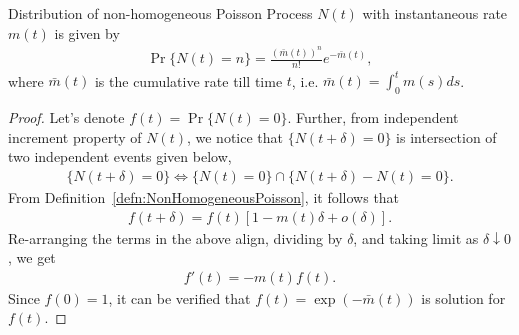 \documentclass[a4paper,english,10pt]{article}
\begin{document}
\begin{prop} Distribution of non-homogeneous Poisson Process $N(t)$ with instantaneous rate $m(t)$ is given by
	\begin{align*}
		\Pr\{N(t)=n\}=\frac{(\bar{m}(t))^n}{n!}e^{-\bar{m}(t)},
	\end{align*}
	where $\bar{m}(t)$ is the cumulative rate till time $t$, i.e. $\bar{m}(t)=\int_{0}^{t}m(s)ds$. 
\end{prop}
\begin{proof}
	Let's denote $f(t) = \Pr\{N(t)=0\}$. Further, from independent increment property of $N(t)$, we notice that $\{N(t+\delta) = 0\}$ is intersection of two independent events given below, 
	\begin{align*}
		\{N(t+\delta)=0\} \iff \{N(t)=0\}\cap\{N(t+\delta)-N(t)=0\}.
	\end{align*}
	From Definition~\ref{defn:NonHomogeneousPoisson}, it follows that
	\begin{align*}
		f(t+\delta) = f(t)[1 - m(t)\delta + o(\delta)].
	\end{align*}
	Re-arranging the terms in the above align, dividing by $\delta$, and taking limit as $\delta \downarrow 0$, we get 
	\begin{align*}
		f'(t) = -m(t)f(t).
	\end{align*}
	Since $f(0) = 1$, it can be verified that $f(t) = \exp(-\bar{m}(t))$ is solution for $f(t)$.

\end{proof}
\end{document}
